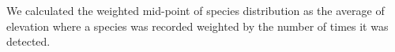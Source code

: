 \documentclass{article}
\begin{document}


We calculated the weighted mid-point of species distribution as the average of elevation where a species was recorded weighted by the number of times it was detected. 
\end{document}
